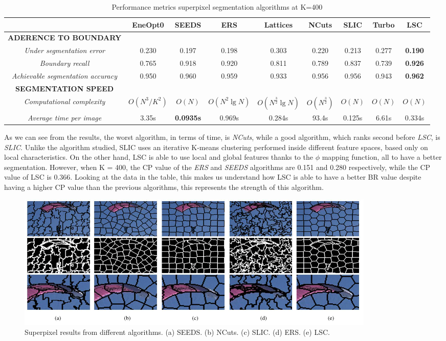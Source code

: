 \begin{table}[h!]
    \centering
    \begin{adjustbox}{max width=\textwidth}
    \begin{tabular}{*{9}{|c}|}%
        \hline
        & EneOpt0 & SEEDS & ERS & Lattices & NCuts & SLIC & Turbo & LSC \\
        \hline
        \bfseries{ADERENCE TO BOUNDARY} & & & & & & & & \\
        \emph{Under segmentation error} & 0.230 & 0.197 & 0.198 & 0.303 & 0.220 & 0.213 & 0.277 & \bfseries{0.190}\\
        \emph{Boundary recall} & 0.765 & 0.918 & 0.920 & 0.811 & 0.789 & 0.837 & 0.739 & \bfseries{0.926}\\
        \emph{Achievable segmentation accuracy} & 0.950 & 0.960 & 0.959 & 0.933 & 0.956 & 0.956 & 0.943 & \bfseries{0.962}\\
        \hline
        \bfseries{SEGMENTATION SPEED} & & & & & & & & \\
        \emph{Computational complexity} & $ O(N^3/K^2) $ & $ O(N) $ & $ O(N^2 \lg{N}) $ & $ O(N^{\frac{3}{2}} \lg{N}) $ & $ O(N^{\frac{3}{2}}) $ & $ O(N) $ & $ O(N) $ & $ O(N) $\\
        \emph{Average time per image} & 3.35s & \bfseries{0.0935}s & 0.969s & 0.284s & 93.4s & 0.125s & 6.61s & 0.334s\\
        \hline
    \end{tabular}
    \end{adjustbox}
    \caption{Performance metrics superpixel segmentation algorithms at K=400}
    \label{table superpixels}
\end{table}
As we can see from the results, the worst algorithm, in terms of time, 
is \emph{NCuts}, while a good algorithm, which ranks second before \emph{LSC}, is \emph{SLIC}. 
Unlike the algorithm studied, SLIC uses an iterative K-means clustering 
performed inside different feature spaces, based only on local characteristics. 
On the other hand, LSC is able to use local and global features thanks to the 
$ \phi $  mapping function, all to have a better segmentation. However, when 
K = 400, the CP value of the \emph{ERS} \cite{0781426508} and \emph{SEEDS} \cite{0781426509} algorithms are 0.151 
and 0.280 respectively, while the CP value of LSC is 0.366. Looking at the data 
in the table, this makes us understand how LSC is able to have a better BR 
value despite having a higher CP value than the previous algorithms, this 
represents the strength of this algorithm.

\begin{figure}[htbp]
    \centering
    \includegraphics[width = 1 \linewidth]{images/paper2/superpixelsComparison.png}
    \centering
    \caption{Superpixel results from different algorithms. (a) SEEDS. (b) NCuts. (c) SLIC. (d) ERS. (e) LSC.}
    \label{fig: superpixelsComparison}
\end{figure}